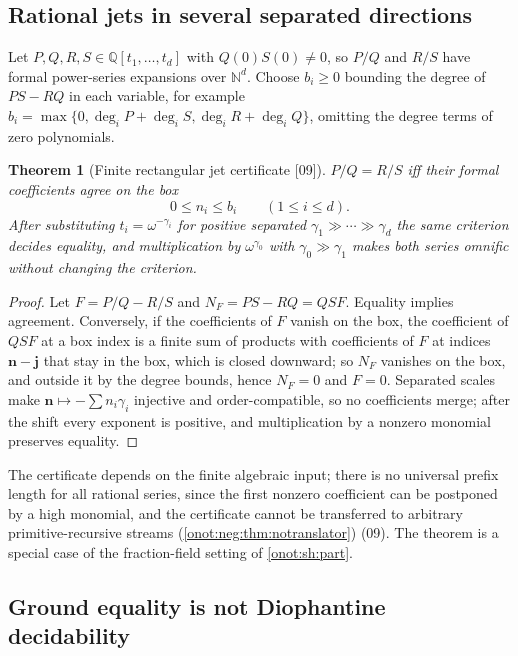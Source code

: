\documentclass[11pt,oneside]{article}
\numberwithin{equation}{section}
\newtheorem{theorem}{Theorem}[section]
\theoremstyle{definition}
\theoremstyle{remark}
\newcommand{\N}{\mathbb N}
\newcommand{\Q}{\mathbb Q}
\newcommand{\src}[1]{\textup{\textsf{\small[#1]}}}
\begin{document}
\subsection{Rational jets in several separated directions}

Let $P,Q,R,S\in\Q[t_1,\ldots,t_d]$ with $Q(0)S(0)\ne0$, so $P/Q$ and $R/S$ have
formal power-series expansions over $\N^d$. Choose $b_i\ge0$ bounding the degree
of $PS-RQ$ in each variable, for example
$b_i=\max\{0,\deg_iP+\deg_iS,\deg_iR+\deg_iQ\}$, omitting the degree terms of zero
polynomials.

\begin{theorem}[Finite rectangular jet certificate \src{09}]\label{onot:grid:thm:jets}
$P/Q=R/S$ iff their formal coefficients agree on the box
\begin{equation}\label{onot:grid:eq:jetbox}
 0\le n_i\le b_i\qquad(1\le i\le d).
\end{equation}
After substituting $t_i=\omega^{-\gamma_i}$ for positive separated
$\gamma_1\gg\cdots\gg\gamma_d$ the same criterion decides equality, and
multiplication by $\omega^{\gamma_0}$ with $\gamma_0\gg\gamma_1$ makes both series
omnific without changing the criterion.
\end{theorem}
\begin{proof}
Let $F=P/Q-R/S$ and $N_F=PS-RQ=QSF$. Equality implies agreement. Conversely, if
the coefficients of $F$ vanish on the box, the coefficient of $QSF$ at a box
index is a finite sum of products with coefficients of $F$ at indices
$\mathbf n-\mathbf j$ that stay in the box, which is closed downward; so $N_F$
vanishes on the box, and outside it by the degree bounds, hence $N_F=0$ and
$F=0$. Separated scales make $\mathbf n\mapsto-\sum n_i\gamma_i$ injective and
order-compatible, so no coefficients merge; after the shift every exponent is
positive, and multiplication by a nonzero monomial preserves equality.
\end{proof}
The certificate depends on the finite algebraic input; there is no universal
prefix length for all rational series, since the first nonzero coefficient can be
postponed by a high monomial, and the certificate cannot be transferred to
arbitrary primitive-recursive streams (\cref{onot:neg:thm:notranslator}) (09). The
theorem is a special case of the fraction-field setting of \cref{onot:sh:part}.

\subsection{Ground equality is not Diophantine decidability}
\end{document}
